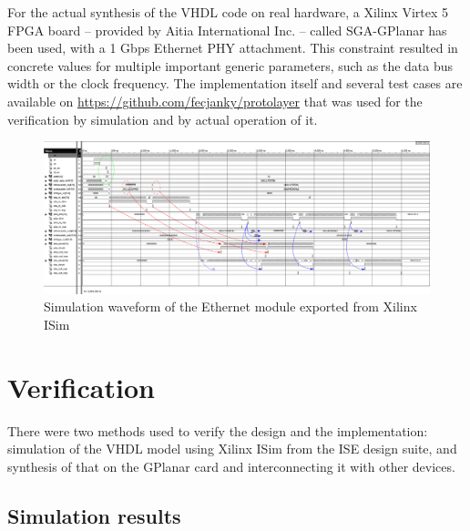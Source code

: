 \documentclass[journal]{IEEEtran}
\begin{document}
For the actual synthesis of the VHDL code on real hardware, a Xilinx Virtex 5 FPGA board -- provided by Aitia
International Inc. -- called SGA-GPlanar \cite{GPlanar} has been used, with a 1 Gbps Ethernet PHY attachment. This
constraint resulted in concrete values for multiple important generic parameters, such as the data bus width or the
clock frequency.
The implementation itself and several test cases are available on \cite{GIT_protolayer}
\url{https://github.com/fecjanky/protolayer} that was used for the verification by simulation and by actual operation
of it.

\begin{figure}[!htb]
    \centering
    \includegraphics[width=1\textwidth]{figures_raw/ether_tst_wave_annotated.png}
    \caption{Simulation waveform of the Ethernet module exported from Xilinx ISim}
    \label{fig:eth_sim}
\end{figure}

\section{Verification}\label{sec:Verification}

There were two methods used to verify the design and the implementation:
simulation of the VHDL model using Xilinx ISim from the ISE design suite, and
synthesis of that on the GPlanar card and interconnecting it with other
devices.

\subsection{Simulation results}
\end{document}
